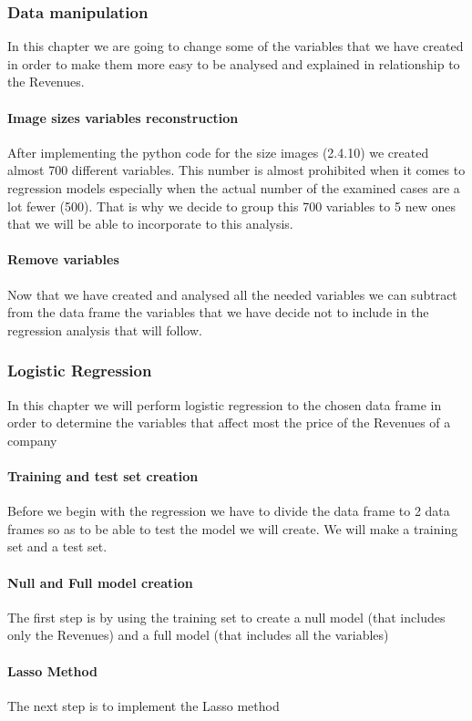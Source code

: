 \documentclass{article}
\begin{document}
\subsubsection{Data manipulation}
In this chapter we are going to change some of the variables that we have created in order to make them more easy to be analysed and explained in relationship to the Revenues. 
\paragraph{Image sizes variables reconstruction}
After implementing the python code for the size images (2.4.10) we created almost 700 different variables. This number is almost prohibited when it comes to regression models especially when the actual number of the examined cases are a lot fewer (500). That is why we decide to group this 700 variables to 5 new ones that we will be able to incorporate to this analysis.
\paragraph{Remove variables}
Now that we have created and analysed all the needed variables we can subtract from the data frame the variables that we have decide not to include in the regression analysis that will follow.
\subsubsection{Logistic Regression}
In this chapter we will perform logistic regression to the chosen data frame in order to determine the variables that affect most the price of the Revenues of a company
\paragraph{Training and test set creation}
Before we begin with the regression we have to divide the data frame to 2 data frames so as to be able to test the model we will create. We will make a training set and a test set.
\paragraph{Null and Full model creation}
The first step is by using the training set to create a null model (that includes only the Revenues) and a full model (that includes all the variables)
\paragraph{Lasso Method}
The next step is to implement the Lasso method
\end{document}
